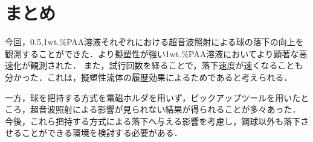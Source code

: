 \clearpage
\section{まとめ}

今回，0.5,1wt.\%PAA溶液それぞれにおける超音波照射による球の落下の向上を観測することができた．より擬塑性が強い1wt.\%PAA溶液においてより顕著な高速化が観測された．
また，試行回数を経ることで，落下速度が速くなることも分かった．これは，擬塑性流体の履歴効果によるためであると考えられる．

一方，球を把持する方式を電磁ホルダを用いず，ピックアップツールを用いたところ，超音波照射による影響が見られない結果が得られることが多々あった．
今後，これら把持する方式による落下へ与える影響を考慮し，鋼球以外も落下させることができる環境を検討する必要がある．
